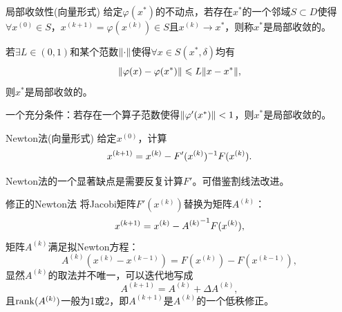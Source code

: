 \begin{definition}
    {局部收敛性(向量形式)}{}
    给定$\varphi(x^*)$的不动点，若存在$x^*$的一个邻域$S \subset D$使得$\forall x^{(0)} \in S$，$x^{(k+1)} = \varphi(x^{(k)}) \in S$且$x^{(k)} \to x^*$，则称$x^*$是局部收敛的。
\end{definition}

\begin{theorem}
    {}{}
    若$\exists L \in (0,1)$和某个范数$\lVert\cdot\rVert$使得$\forall x \in S(x^*,\delta)$均有
    \[
        \lVert\varphi(x) - \varphi(x^*)\rVert \leqslant L\lVert x - x^*\rVert,
    \]
    则$x^*$是局部收敛的。
\end{theorem}

\begin{corollary}
    一个充分条件：若存在一个算子范数使得$\lVert\varphi'(x^*)\rVert < 1$，则$x^*$是局部收敛的。
\end{corollary}

\begin{theorem}
    {Newton法(向量形式)}{}
    给定$x^{(0)}$，计算 
    \begin{equation}\label{eq:na-multivariate-newton}
        x^{(k+1)} = x^{(k)} - F'(x^{(k)})^{-1} F(x^{(k)}).
    \end{equation}
\end{theorem}

\begin{remark}
    Newton法的一个显著缺点是需要反复计算$F'$。可借鉴割线法改进。
\end{remark}

\begin{theorem}
    {修正的Newton法}{}
    将Jacobi矩阵$F'(x^{(k)})$替换为矩阵$A^{(k)}$：
    \begin{equation}\label{eq:na-quasi-newton}
        x^{(k+1)} = x^{(k)} - {A^{(k)}}^{-1} F(x^{(k)}),
    \end{equation}
    矩阵$A^{(k)}$满足拟Newton方程：
    \begin{equation}
        A^{(k)}(x^{(k)} - x^{(k-1)}) = F(x^{(k)}) - F(x^{(k-1)}),
    \end{equation}
    显然$A^{(k)}$的取法并不唯一，可以迭代地写成
    \[
        A^{(k+1)} = A^{(k)} + \Delta A^{(k)},
    \]
    且$\operatorname{rank}(A^{(k)})$一般为1或2，即$A^{(k+1)}$是$A^{(k)}$的一个低秩修正。
\end{theorem}


